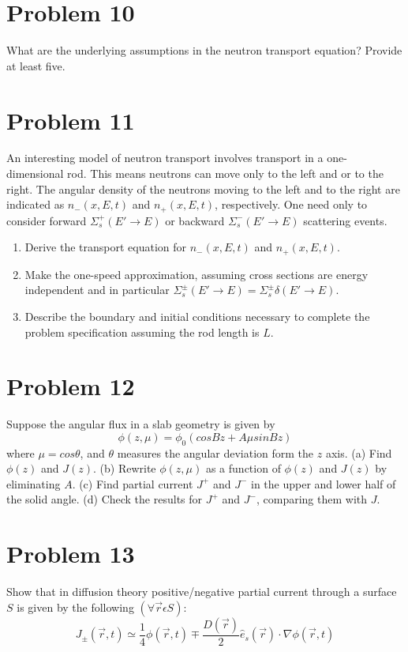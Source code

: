 \documentclass{article}
\begin{document}
\section*{Problem 10}

What are the underlying assumptions in the neutron transport equation? Provide at least five.

\section*{Problem 11}

An interesting model of neutron transport involves transport in a one-dimensional rod. This
means neutrons can move only to the left and or to the right. The angular density of the
neutrons moving to the left and to the right are indicated as $n_{-}(x,E,t)$ and $n_{+}(x,E,t)$,
respectively. One need only to consider forward $\Sigma^{+}_{s}
(E' \rightarrow E)$ or backward $\Sigma^{-}_{s}(E' \rightarrow E)$ scattering events.

\begin{enumerate}[label=(\alph*)]
\item Derive the transport equation for $n_{-}(x,E, t)$ and $n_{+}(x,E,t)$.
\item Make the one-speed approximation, assuming cross sections are energy independent and
in particular $\Sigma^{\pm}_{s}(E' \rightarrow E) = \Sigma^{\pm}_{s} \delta (E' \rightarrow E)$.
\item Describe the boundary and initial conditions necessary to complete the problem specification
assuming the rod length is $L$.
\end{enumerate}

\section*{Problem 12}

Suppose the angular flux in a slab geometry is given by
$$\phi(z,\mu) = \phi_{0}(cosBz + A\mu sinBz)$$
where $\mu = cos\theta$, and $\theta$ measures the angular deviation form the $z$ axis.
(a) Find $\phi(z)$ and $J(z)$.
(b) Rewrite $\phi(z,\mu)$ as a function of $\phi(z)$ and $J(z)$ by eliminating $A$.
(c) Find partial current $J^{+}$ and $J^{-}$ in the upper and lower half of the solid angle.
(d) Check the results for $J^{+}$ and $J^{-}$, comparing them with $J$.

\section*{Problem 13}

Show that in diffusion theory positive/negative partial current through a surface $S$ is given by
the following $(\forall \vec{r} \epsilon S)$:
$$J_{\pm}(\vec{r},t) \simeq \frac{1}{4}\phi(\vec{r},t) \mp \frac{D(\vec{r})}{2}\hat{e}_{s}(\vec{r}) \cdot \nabla \phi(\vec{r},t) $$
\end{document}
